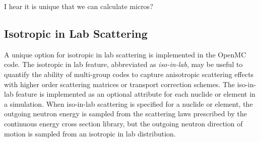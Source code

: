 I hear it is unique that we can calculate micros?


\subsection{Isotropic in Lab Scattering}
\label{subsec:iso-in-lab}

A unique option for isotropic in lab scattering is implemented in the OpenMC code. The isotropic in lab feature, abbreviated as \textit{iso-in-lab}, may be useful to quantify the ability of multi-group codes to capture anisotropic scattering effects with higher order scattering matrices or transport correction schemes. The iso-in-lab feature is implemented as an optional attribute for each nuclide or element in a simulation. When iso-in-lab scattering is specified for a nuclide or element, the outgoing neutron energy is sampled from the scattering laws prescribed by the continuous energy cross section library, but the outgoing neutron direction of motion is sampled from an isotropic in lab distribution. 